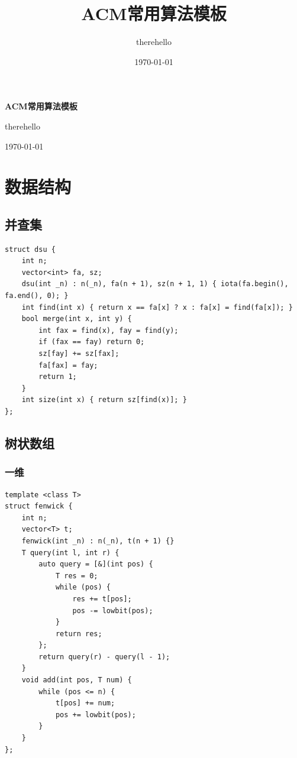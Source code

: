 \documentclass[UTF8, twoside]{ctexart}
\title{ACM常用算法模板}
\author{therehello}
\date{\today}
\newcommand\blankpage{
    \null
    \thispagestyle{empty}
    \addtocounter{page}{-1}
    \newpage
}
\begin{document}
\begin{sloppypar}

\begin{titlepage}
    \centering
    {\fontsize{40pt}{0pt}\selectfont \textbf{ACM常用算法模板}\par} %
    \vfill %
    {\fontsize{12pt}{0pt}\selectfont therehello\par} %
    \today %
\end{titlepage}

\blankpage

\tableofcontents

\clearpage

\section{数据结构}

\subsection{并查集}

\begin{lstlisting}[style=cpp]
struct dsu {
    int n;
    vector<int> fa, sz;
    dsu(int _n) : n(_n), fa(n + 1), sz(n + 1, 1) { iota(fa.begin(), fa.end(), 0); }
    int find(int x) { return x == fa[x] ? x : fa[x] = find(fa[x]); }
    bool merge(int x, int y) {
        int fax = find(x), fay = find(y);
        if (fax == fay) return 0;
        sz[fay] += sz[fax];
        fa[fax] = fay;
        return 1;
    }
    int size(int x) { return sz[find(x)]; }
};
\end{lstlisting}

\subsection{树状数组}

\subsubsection{一维}

\begin{lstlisting}[style=cpp]
template <class T>
struct fenwick {
    int n;
    vector<T> t;
    fenwick(int _n) : n(_n), t(n + 1) {}
    T query(int l, int r) {
        auto query = [&](int pos) {
            T res = 0;
            while (pos) {
                res += t[pos];
                pos -= lowbit(pos);
            }
            return res;
        };
        return query(r) - query(l - 1);
    }
    void add(int pos, T num) {
        while (pos <= n) {
            t[pos] += num;
            pos += lowbit(pos);
        }
    }
};
\end{lstlisting}


\end{sloppypar}
\end{document}
